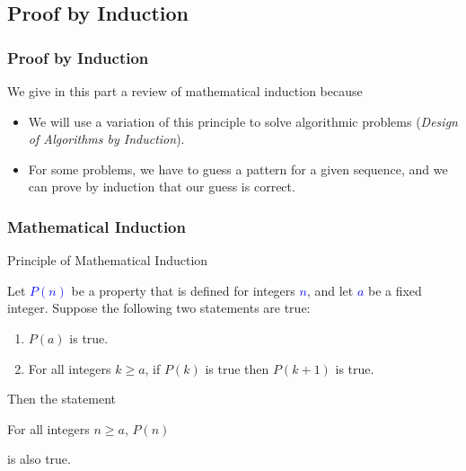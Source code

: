 \documentclass{beamer}
\begin{document}
\subsection{Proof by Induction}

\begin{frame}%
\frametitle{Proof by Induction}

We give in this part a review of mathematical induction because
\begin{itemize}

\item<1-> We will use a variation of this principle
to solve algorithmic problems (\emph{Design of Algorithms by Induction}).

\vspace{0.3cm}

\item<2-> For some problems, we have to guess a pattern for a given sequence, and we can prove
by induction that our guess is correct.

\end{itemize}

\end{frame}


\begin{frame}%
\frametitle{Mathematical Induction}

\begin{block}{Principle of Mathematical Induction}

Let \textcolor{blue}{$P(n)$} be a property that is defined for integers \textcolor{blue}{$n$}, and let \textcolor{blue}{$a$} be a fixed integer.
Suppose the following two statements are true:\\
\begin{enumerate}
\item<2-> $P(a)$ is true.\\

\item<2-> For all integers $k \ge a$, if $P(k)$ is true then $P(k+1)$ is true.
\end{enumerate}

Then the statement
\begin{center}
For all integers $n \ge a$, $P(n)$
\end{center}
is also true.
\end{block}

\end{frame}
\end{document}
